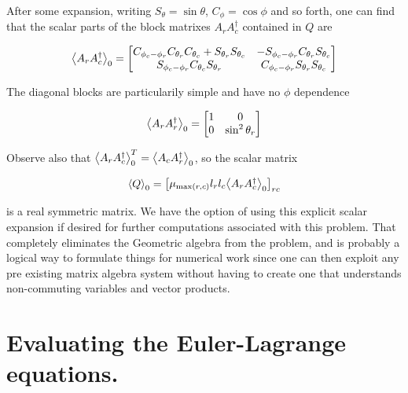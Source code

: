After some expansion, writing $S_\theta = \sin\theta$, $C_\phi = \cos\phi$ and so forth, one can find that the scalar parts of the block matrixes $A_r A_c^\dagger$ contained in $Q$ are

\begin{align}\label{eqn:multiPendulumSpherical2:boo20}
{\left\langle{{A_r A_c^\dagger}}\right\rangle}_{0}
=
\begin{bmatrix}
C_{\phi_c - \phi_r} 
C_{\theta_r}
C_{\theta_c}
+S_{\theta_r}
S_{\theta_c} &
-S_{\phi_c - \phi_r} C_{\theta_r} S_{\theta_c} \\
S_{\phi_c - \phi_r} C_{\theta_c} S_{\theta_r} &
C_{\phi_c - \phi_r} S_{\theta_r} S_{\theta_c}
\end{bmatrix}
\end{align}

The diagonal blocks are particularily simple and have no $\phi$ dependence

\begin{align}\label{eqn:multiPendulumSpherical2:boo20d}
{\left\langle{{A_r A_r^\dagger}}\right\rangle}_{0}
=
\begin{bmatrix}
1 & 0 \\
0 & \sin^2 \theta_r
\end{bmatrix}
\end{align}

Observe also that ${\left\langle{{A_r A_c^\dagger}}\right\rangle}_{0}^T = {\left\langle{{A_c A_r^\dagger}}\right\rangle}_{0}$, so the scalar matrix

\begin{align}\label{eqn:multiPendulumSpherical2:boo21}
{\left\langle{{Q}}\right\rangle}_{0} = 
{\begin{bmatrix}
\mu_{\max(r,c)} l_r l_c {\left\langle{{ A_r A_c^\dagger }}\right\rangle}_{0}
\end{bmatrix}}_{rc}
\end{align}

is a real symmetric matrix.  We have the option of using this explicit scalar expansion if desired for further computations associated with this problem.  That completely eliminates the Geometric algebra from the problem, and is probably a logical way to formulate things for numerical work since one can then exploit any pre existing matrix algebra system without having to create one that understands non-commuting variables and vector products.

\section{Evaluating the Euler-Lagrange equations.}

